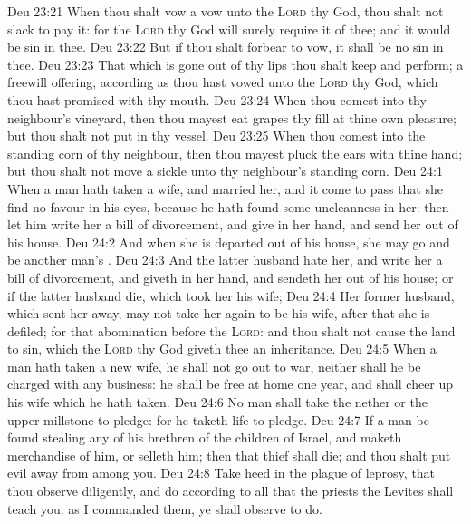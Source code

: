 \vs Deu 23:21 When thou shalt vow a vow unto the \textsc{Lord} thy God, thou shalt not slack to pay it: for the \textsc{Lord} thy God will surely require it of thee; and it would be sin in thee.
\vs Deu 23:22 But if thou shalt forbear to vow, it shall be no sin in thee.
\vs Deu 23:23 That which is gone out of thy lips thou shalt keep and perform;  a freewill offering, according as thou hast vowed unto the \textsc{Lord} thy God, which thou hast promised with thy mouth.
\vs Deu 23:24 When thou comest into thy neighbour's vineyard, then thou mayest eat grapes thy fill at thine own pleasure; but thou shalt not put  in thy vessel.
\vs Deu 23:25 When thou comest into the standing corn of thy neighbour, then thou mayest pluck the ears with thine hand; but thou shalt not move a sickle unto thy neighbour's standing corn.
\vs Deu 24:1 When a man hath taken a wife, and married her, and it come to pass that she find no favour in his eyes, because he hath found some uncleanness in her: then let him write her a bill of divorcement, and give  in her hand, and send her out of his house.
\vs Deu 24:2 And when she is departed out of his house, she may go and be another man's .
\vs Deu 24:3 And  the latter husband hate her, and write her a bill of divorcement, and giveth  in her hand, and sendeth her out of his house; or if the latter husband die, which took her  his wife;
\vs Deu 24:4 Her former husband, which sent her away, may not take her again to be his wife, after that she is defiled; for that  abomination before the \textsc{Lord}: and thou shalt not cause the land to sin, which the \textsc{Lord} thy God giveth thee  an inheritance.
\vs Deu 24:5 When a man hath taken a new wife, he shall not go out to war, neither shall he be charged with any business:  he shall be free at home one year, and shall cheer up his wife which he hath taken.
\vs Deu 24:6 No man shall take the nether or the upper millstone to pledge: for he taketh  life to pledge.
\vs Deu 24:7 If a man be found stealing any of his brethren of the children of Israel, and maketh merchandise of him, or selleth him; then that thief shall die; and thou shalt put evil away from among you.
\vs Deu 24:8 Take heed in the plague of leprosy, that thou observe diligently, and do according to all that the priests the Levites shall teach you: as I commanded them,  ye shall observe to do.
